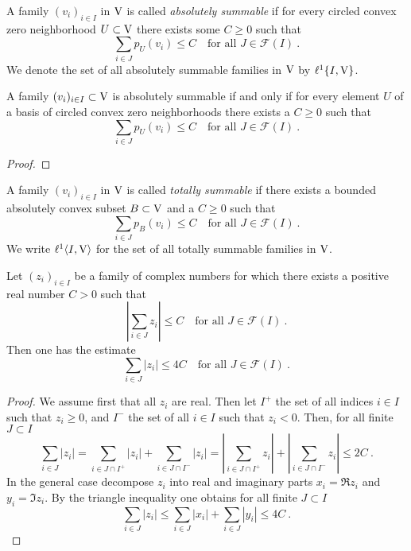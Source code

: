 \begin{definition}
  A family  $(v_i)_{i \in I}$ in $\mathrm{V}$ is called \emph{absolutely summable} if for every circled convex 
  zero neighborhood $U \subset \mathrm{V}$ there exists some $C\geq 0$ such that
  \[
    \sum_{i \in J} p_U \left( v_i\right) \leq C \quad \text{for all } J \in \mathscr{F} (I) \ .
  \]
  We denote the set of all absolutely summable families  in $\mathrm{V}$ by  $\ell^1 \{ I, \mathrm{V} \}$.
\end{definition}

\begin{proposition}
  A family $(v_i)_{i \in I} \subset \mathrm{V}$ is absolutely summable if and only if for every element $U$ 
  of a basis of circled convex zero neighborhoods there exists a $C\geq 0$ such that
  \[
    \sum_{i \in J} p_U \left( v_i\right) \leq C \quad \text{for all } J \in \mathscr{F} (I) \ .
  \]
\end{proposition}

\begin{proof}
  
\end{proof}

\begin{definition}
 A family $(v_i)_{i \in I}$ in $\mathrm{V}$ is called \emph{totally summable} if there exists a bounded 
 absolutely convex subset $B\subset \mathrm{V}$  and a $C\geq 0$ such that
 \[
   \sum_{i \in J} p_B \left( v_i\right) \leq C  \quad \text{for all } J \in \mathscr{F} (I) \ .
 \]
 We write $\ell^1 \langle I, \mathrm{V} \rangle$ for the set of all totally summable families in $\mathrm{V}$.
\end{definition}


\begin{lemma}
  Let $(z_i)_{i\in I}$ be a family of  complex numbers for which there exists a positive real number $C > 0$ 
  such that 
  \[
     \left|\sum_{i\in J} z_i \right| \leq C \quad \text{for all } J \in \mathscr{F} (I) \ .
  \]
  Then one has the estimate
   \[
     \sum_{i\in J}\left| z_i \right| \leq 4 C \quad \text{for all } J \in \mathscr{F} (I) \ .
  \]
\end{lemma}

\begin{proof}
  We assume first that all $z_i$ are real. Then let $I^+$ the set of all indices $i\in I$ such that $z_i \geq 0$,
  and $I^-$ the set of all  $i\in I$ such that $z_i < 0$. Then, for all finite $J\subset I$
  \[
     \sum_{i\in J} \left| z_i \right| =  \sum_{i\in J\cap I^+}  \left| z_i  \right| +  \sum_{i\in J\cap I^-}  \left| z_i  \right|
    =  \left| \sum_{i\in J\cap I^+}  z_i  \right| +  \left| \sum_{i\in J\cap I^-}  z_i  \right| \leq 2  C \ .
  \] 
  In the general case decompose $z_i$ into real and imaginary parts $x_i = \Re z_i$ and   $y_i = \Im z_i$.
  By the triangle inequality one obtains for all finite $J\subset I$
  \[
    \sum_{i\in J} \left| z_i \right| \leq \sum_{i\in J} \left| x_i \right| + \sum_{i\in J} \left| y_i \right| \leq 4 C \ .
  \]
\end{proof}

